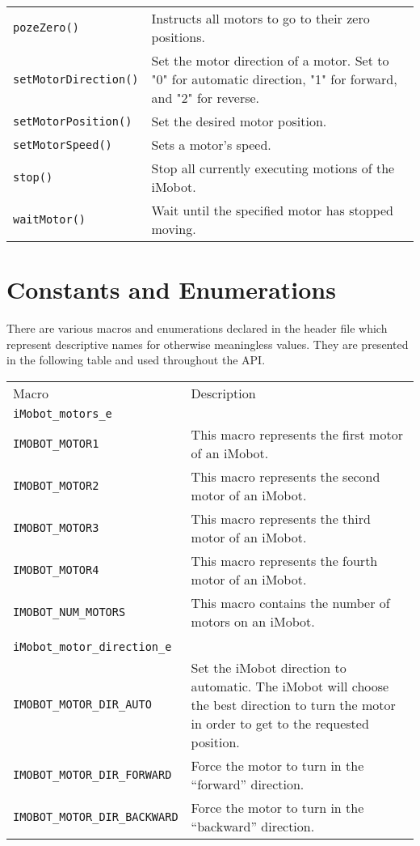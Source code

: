 \begin{table}[!hp]
\begin{center}
\begin{tabular}{p{38 mm}p{77 mm}}
\texttt{pozeZero()} \dotfill & Instructs all motors to go to their zero positions. \\
\texttt{setMotorDirection()} \dotfill & Set the motor direction of a motor. Set
to "0" for automatic direction, "1" for forward, and "2" for reverse. \\
\texttt{setMotorPosition()} \dotfill & Set the desired motor position. \\
\texttt{setMotorSpeed()} \dotfill & Sets a motor's speed. \\
\texttt{stop()} \dotfill & Stop all currently executing motions of the iMobot. \\
\texttt{waitMotor()} \dotfill & Wait until the specified motor has stopped moving. \\
\hline
\end{tabular}
\end{center}
\label{mobilec_api_cbinary}
\end{table}

\section{Constants and Enumerations}
There are various macros and enumerations declared in the header file which 
represent descriptive names for otherwise meaningless values. They are 
presented in the following table and used throughout the API.

\begin{tabular}{lp{3.7in}}
Macro & Description \\
\texttt{iMobot\_motors\_e} & \\\hline
\texttt{IMOBOT\_MOTOR1} & This macro represents the first motor of an iMobot. \\
\texttt{IMOBOT\_MOTOR2} & This macro represents the second motor of an iMobot. \\
\texttt{IMOBOT\_MOTOR3} & This macro represents the third motor of an iMobot. \\
\texttt{IMOBOT\_MOTOR4} & This macro represents the fourth motor of an iMobot. \\
\texttt{IMOBOT\_NUM\_MOTORS} & This macro contains the number of motors on an iMobot. \\
 & \\
\texttt{iMobot\_motor\_direction\_e} & \\\hline
\texttt{IMOBOT\_MOTOR\_DIR\_AUTO} & Set the iMobot direction to automatic. The iMobot will choose the best direction to turn the motor in order to get to the requested position. \\
\texttt{IMOBOT\_MOTOR\_DIR\_FORWARD} & Force the motor to turn in the ``forward'' direction. \\
\texttt{IMOBOT\_MOTOR\_DIR\_BACKWARD} & Force the motor to turn in the ``backward'' direction.
\end{tabular}

